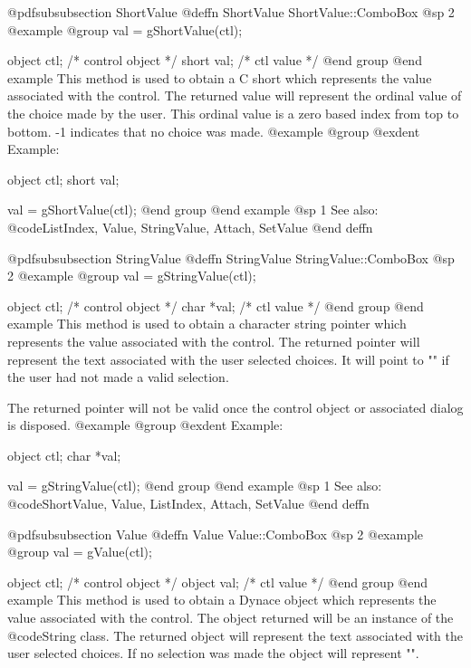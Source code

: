 @pdfsubsubsection {ShortValue}
@deffn {ShortValue} ShortValue::ComboBox
@sp 2
@example
@group
val = gShortValue(ctl);

object  ctl;   /*  control object  */
short   val;   /*  ctl value       */
@end group
@end example
This method is used to obtain a C short which represents the value
associated with the control.  The returned value will represent the
ordinal value of the choice made by the user.  This ordinal value is a
zero based index from top to bottom.  -1 indicates that no choice was
made.
@example
@group
@exdent Example:

object  ctl;
short   val;

val = gShortValue(ctl);
@end group
@end example
@sp 1
See also:  @code{ListIndex, Value, StringValue, Attach, SetValue}
@end deffn










@pdfsubsubsection {StringValue}
@deffn {StringValue} StringValue::ComboBox
@sp 2
@example
@group
val = gStringValue(ctl);

object  ctl;   /*  control object  */
char    *val;  /*  ctl value       */
@end group
@end example
This method is used to obtain a character string pointer which
represents the value associated with the control.  The returned pointer
will represent the text associated with the user selected choices.
It will point to "" if the user had not made a valid selection.

The returned pointer will not be valid once the control object or
associated dialog is disposed.
@example
@group
@exdent Example:

object  ctl;
char    *val;

val = gStringValue(ctl);
@end group
@end example
@sp 1
See also:  @code{ShortValue, Value, ListIndex, Attach, SetValue}
@end deffn










@pdfsubsubsection {Value}
@deffn {Value} Value::ComboBox
@sp 2
@example
@group
val = gValue(ctl);

object  ctl;   /*  control object  */
object  val;   /*  ctl value       */
@end group
@end example
This method is used to obtain a Dynace object which represents the value
associated with the control.  The object returned will be an instance of
the @code{String} class.  The returned object will represent the text
associated with the user selected choices.  If no selection was made
the object will represent "".

